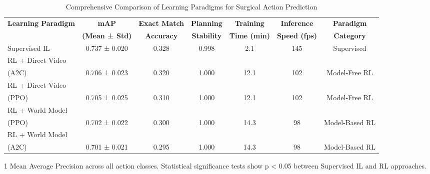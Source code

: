 
\begin{table*}[htbp]
\centering
\caption{Comprehensive Comparison of Learning Paradigms for Surgical Action Prediction}
\label{tab:main_results}
\begin{threeparttable}
\begin{tabular}{lcccccc}
\toprule
\textbf{Learning Paradigm} & \textbf{mAP\tnote{1}} & \textbf{Exact Match} & \textbf{Planning} & \textbf{Training} & \textbf{Inference} & \textbf{Paradigm} \\
                           & \textbf{(Mean ± Std)} & \textbf{Accuracy} & \textbf{Stability} & \textbf{Time (min)} & \textbf{Speed (fps)} & \textbf{Category} \\
\midrule
Supervised IL & 0.737 ± 0.020 & 0.328 & 0.998 & 2.1 & 145 & Supervised \\
RL + Direct Video\\(A2C) & 0.706 ± 0.023 & 0.320 & 1.000 & 12.1 & 102 & Model-Free RL \\
RL + Direct Video\\(PPO) & 0.705 ± 0.025 & 0.310 & 1.000 & 12.1 & 102 & Model-Free RL \\
RL + World Model\\(PPO) & 0.702 ± 0.022 & 0.300 & 1.000 & 14.3 & 98 & Model-Based RL \\
RL + World Model\\(A2C) & 0.701 ± 0.021 & 0.295 & 1.000 & 14.3 & 98 & Model-Based RL \\

\bottomrule
\end{tabular}
\begin{tablenotes}
\item[1] Mean Average Precision across all action classes. Statistical significance tests show p < 0.05 between Supervised IL and RL approaches.
\end{tablenotes}
\end{threeparttable}
\end{table*}
